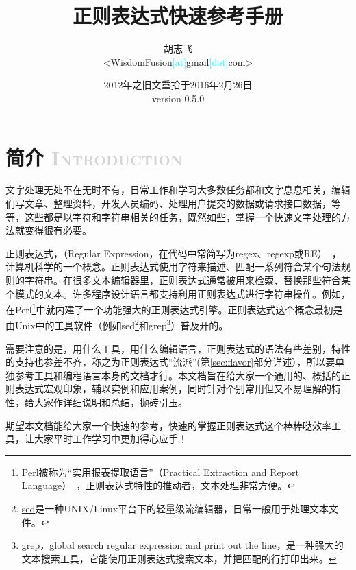 \documentclass[12pt,a4paper,twoside]{ctexart}
\begin{document}
\title{\textbf{正则表达式快速参考手册}}
\author{胡志飞\\<WisdomFusion\textcolor{cyan}{\small [at]}gmail\textcolor{cyan}{\small [dot]}com>}
\date{\color{OrangeRed}2012年之旧文重拾于2016年2月26日\\version 0.5.0}

\maketitle{}
\thispagestyle{empty}
\clearpage{}

\begin{multicols}{2}
\tableofcontents
\end{multicols}

\thispagestyle{empty}
\clearpage{}

\setcounter{page}{1}

\section[简介]{简介 \textcolor{lightgray}{\textsc{Introduction}}}
\label{sec:intro}
文字处理无处不在无时不有，日常工作和学习大多数任务都和文字息息相关，编辑们写文章、整理资料，开发人员编码、处理用户提交的数据或请求接口数据，等等，这些都是以字符和字符串相关的任务，既然如些，掌握一个快速文字处理的方法就变得很有必要。\par
正则表达式，（Regular Expression，在代码中常简写为regex、regexp或RE）~，计算机科学的一个概念。正则表达式使用字符来描述、匹配一系列符合某个句法规则的字符串。在很多文本编辑器里，正则表达式通常被用来检索、替换那些符合某个模式的文本。许多程序设计语言都支持利用正则表达式进行字符串操作。例如，在Perl\footnote{\href{https://www.perl.org/}{Perl}被称为“实用报表提取语言”（Practical Extraction and Report Language）~，正则表达式特性的推动者，文本处理非常方便。}中就内建了一个功能强大的正则表达式引擎。正则表达式这个概念最初是由Unix中的工具软件（例如sed\footnote{\href{http://www.gnu.org/software/sed/manual/sed.html}{sed}是一种UNIX/Linux平台下的轻量级流编辑器，日常一般用于处理文本文件。}和grep\footnote{grep，global search regular expression and print out the line，是一种强大的文本搜索工具，它能使用正则表达式搜索文本，并把匹配的行打印出来。}）普及开的。\par
需要注意的是，用什么工具，用什么编辑语言，正则表达式的语法有些差别，特性的支持也参差不齐，称之为正则表达式“流派”(第\ref{sec:flavor}部分详述），所以要单独参考工具和编程语言本身的文档才行。本文档旨在给大家一个通用的、概括的正则表达式宏观印象，辅以实例和应用案例，同时针对个别常用但又不易理解的特性，给大家作详细说明和总结，抛砖引玉。\par
期望本文档能给大家一个快速的参考，快速的掌握正则表达式这个棒棒哒效率工具，让大家平时工作学习中更加得心应手！\Smiley{} \par
\end{document}
